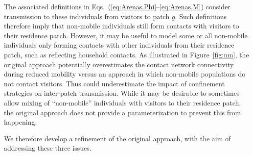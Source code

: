 \begin{enumerate}
  The associated definitions in Eqs.~(\ref{eq:Arenas.Phi}--\ref{eq:Arenas.M})
  consider transmission to these individuals from visitors to patch $g$.
  Such definitions therefore imply that
  non-mobile individuals still form contacts with visitors to their residence patch.
  However, it may be useful to model some or all non-mobile individuals
  only forming contacts with other individuals from their residence patch,
  such as reflecting household contacts.
  As illustrated in Figure~\ref{fig:nm}, the original approach potentially
  overestimates the contact network connectivity during reduced mobility
  versus an approach in which non-mobile populations do not contact visitors.
  Thus \cite{Arenas2020} could underestimate the impact of confinement strategies
  on inter-patch transmission.
  While it may be desirable to sometimes allow mixing of ``non-mobile'' individuals
  with visitors to their residence patch,
  the original approach does not provide a parameterization to prevent this from happening.
\end{enumerate}
We therefore develop a refinement of the original approach,
with the aim of addressing these three issues.
